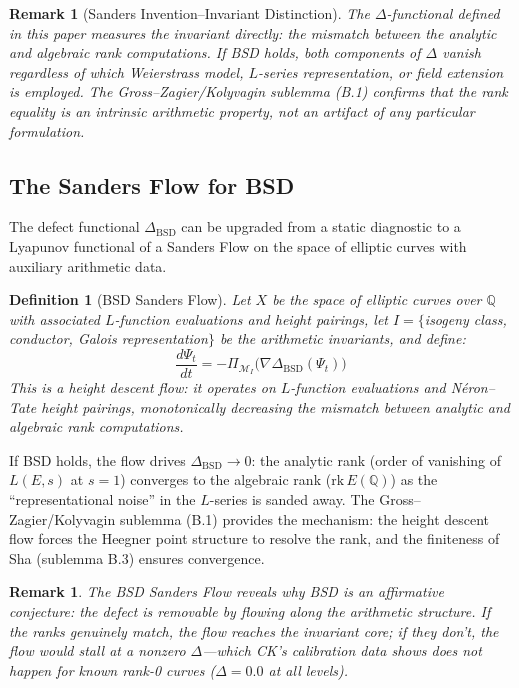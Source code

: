 \documentclass[11pt]{article}
\newtheorem{definition}[theorem]{Definition}
\newtheorem{remark}[theorem]{Remark}
\begin{document}
\begin{remark}[Sanders Invention--Invariant Distinction]
The $\Delta$-functional defined in this paper measures the invariant directly:
the mismatch between the analytic and algebraic rank computations. If BSD holds,
both components of $\Delta$ vanish regardless of which Weierstrass model, $L$-series
representation, or field extension is employed. The Gross--Zagier/Kolyvagin
sublemma (B.1) confirms that the rank equality is an intrinsic arithmetic property,
not an artifact of any particular formulation.
\end{remark}

\subsection*{The Sanders Flow for BSD}

The defect functional $\Delta_{\mathrm{BSD}}$ can be upgraded from a static diagnostic
to a Lyapunov functional of a Sanders Flow on the space of elliptic curves with
auxiliary arithmetic data.

\begin{definition}[BSD Sanders Flow]
Let $X$ be the space of elliptic curves over $\mathbb{Q}$ with associated $L$-function
evaluations and height pairings, let $I = \{$isogeny class, conductor, Galois
representation$\}$ be the arithmetic invariants, and define:
\[
  \frac{d\Psi_t}{dt} = -\Pi_{\mathcal{M}_I}\!\bigl(\nabla \Delta_{\mathrm{BSD}}(\Psi_t)\bigr)
\]
This is a \emph{height descent flow}: it operates on $L$-function evaluations and
N\'eron--Tate height pairings, monotonically decreasing the mismatch between analytic
and algebraic rank computations.
\end{definition}

\noindent
If BSD holds, the flow drives $\Delta_{\mathrm{BSD}} \to 0$: the analytic rank (order of
vanishing of $L(E,s)$ at $s=1$) converges to the algebraic rank ($\mathrm{rk}\, E(\mathbb{Q})$)
as the ``representational noise'' in the $L$-series is sanded away. The
Gross--Zagier/Kolyvagin sublemma (B.1) provides the mechanism: the height descent flow
forces the Heegner point structure to resolve the rank, and the finiteness of Sha
(sublemma B.3) ensures convergence.

\begin{remark}
The BSD Sanders Flow reveals why BSD is an affirmative conjecture: the defect is
\emph{removable} by flowing along the arithmetic structure. If the ranks genuinely
match, the flow reaches the invariant core; if they don't, the flow would stall
at a nonzero $\Delta$---which CK's calibration data shows does not happen for
known rank-0 curves ($\Delta = 0.0$ at all levels).
\end{remark}
\end{document}
